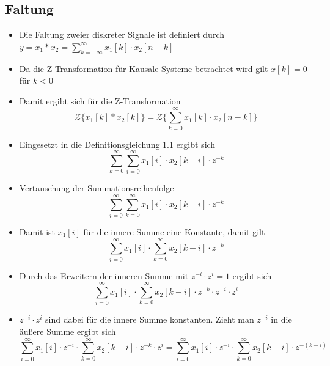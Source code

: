 \documentclass[11pt]{article}
\providecommand{\tightlist}{%
      \setlength{\itemsep}{0pt}\setlength{\parskip}{0pt}}
\def\lt{<}
\begin{document}
    \subsection{Faltung}\label{faltung}

\begin{itemize}
\item
  Die Faltung zweier diskreter Signale ist definiert durch
  \(y = x_1 * x_2 = \sum_{k=-\infty}^\infty x_1[k] \cdot x_2[n-k]\)
\item
  Da die Z-Transformation für Kausale Systeme betrachtet wird gilt
  \(x[k] = 0\) für \(k \lt 0\)
\end{itemize}

    \begin{itemize}
\tightlist
\item
  Damit ergibt sich für die Z-Transformation
  \[\mathcal{Z} \{x_1[k] * x_2[k]\} = \mathcal{Z} \{\sum_{k=0}^\infty x_1[k] \cdot x_2[n-k]\}\]
\end{itemize}

    \begin{itemize}
\tightlist
\item
  Eingesetzt in die Definitionsgleichung 1.1 ergibt sich
  \[\sum_{k=0}^\infty \sum_{i=0}^\infty x_1[i] \cdot x_2[k-i] \cdot z^{-k}\]
\end{itemize}

    \begin{itemize}
\tightlist
\item
  Vertauschung der Summationsreihenfolge
  \[\sum_{i=0}^\infty \sum_{k=0}^\infty x_1[i] \cdot x_2[k-i] \cdot z^{-k}\]
\end{itemize}

    \begin{itemize}
\tightlist
\item
  Damit ist \(x_1[i]\) für die innere Summe eine Konstante, damit gilt
  \[\sum_{i=0}^\infty x_1[i] \cdot \sum_{k=0}^\infty x_2[k-i] \cdot z^{-k}\]
\end{itemize}

    \begin{itemize}
\tightlist
\item
  Durch das Erweitern der inneren Summe mit \(z^{-i} \cdot z^{i} = 1\)
  ergibt sich
  \[\sum_{i=0}^\infty x_1[i] \cdot \sum_{k=0}^\infty x_2[k-i] \cdot z^{-k} \cdot z^{-i} \cdot z^{i}\]
\end{itemize}

    \begin{itemize}
\tightlist
\item
  \(z^{-i} \cdot z^{i}\) sind dabei für die innere Summe konstanten.
  Zieht man \(z^{-i}\) in die äußere Summe ergibt sich
  \[\sum_{i=0}^\infty x_1[i] \cdot z^{-i} \cdot \sum_{k=0}^\infty x_2[k-i] \cdot z^{-k} \cdot z^{i} = \sum_{i=0}^\infty x_1[i] \cdot z^{-i} \cdot \sum_{k=0}^\infty x_2[k-i] \cdot z^{-(k - i)}\]
\end{itemize}
\end{document}
